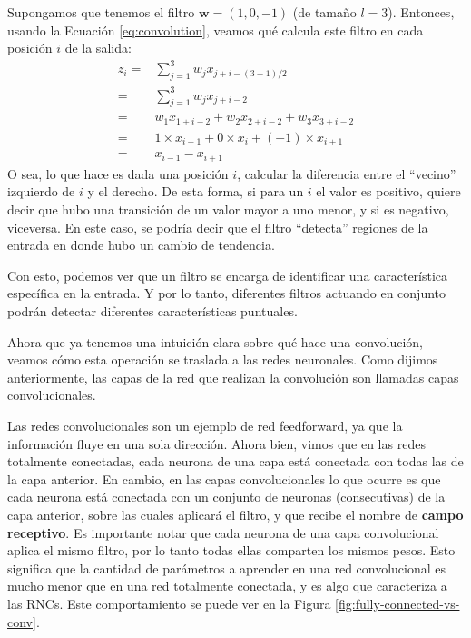 \documentclass[../../main.tex]{subfiles}
\begin{document}
Supongamos que tenemos el filtro \(\bm{w} = (1, 0, -1)\) (de tamaño \(l=3\)). Entonces,
usando la Ecuación \ref{eq:convolution}, veamos qué calcula este filtro en cada
posición \(i\) de la salida:
\begin{align*}
    z_i =& \sum_{j=1}^3 w_j x_{j+i-(3+1)/2} \\
        =& \sum_{j=1}^3 w_j x_{j+i-2} \\
        =& w_1 x_{1+i-2} + w_2 x_{2+i-2} + w_3 x_{3+i-2} \\
        =& 1 \times x_{i-1} + 0 \times x_i + (-1) \times x_{i+1} \\
        =& x_{i-1} - x_{i+1}
\end{align*}
O sea, lo que hace es dada una posición \(i\), calcular la diferencia entre el ``vecino''
izquierdo de \(i\) y el derecho. De esta forma, si para un \(i\) el valor es positivo,
quiere decir que hubo una transición de un valor mayor a uno menor, y si es negativo,
viceversa. En este caso, se podría decir que el filtro ``detecta'' regiones de la entrada
en donde hubo un cambio de tendencia.

Con esto, podemos ver que un filtro se encarga de identificar una característica
específica en la entrada. Y por lo tanto, diferentes filtros actuando en conjunto podrán
detectar diferentes características puntuales.

Ahora que ya tenemos una intuición clara sobre qué hace una convolución, veamos
cómo esta operación se traslada a las redes neuronales. Como dijimos anteriormente,
las capas de la red que realizan la convolución son llamadas capas convolucionales.

Las redes convolucionales son un ejemplo de red feedforward, ya que la información fluye
en una sola dirección. Ahora bien, vimos que en las redes totalmente conectadas, cada
neurona de una capa está conectada con todas las de la capa anterior. En cambio, en las
capas convolucionales lo que ocurre es que cada neurona está conectada con un conjunto de
neuronas (consecutivas) de la capa anterior, sobre las cuales aplicará el filtro, y que
recibe el nombre de \textbf{campo receptivo}. Es importante notar que cada neurona de una
capa convolucional aplica el mismo filtro, por lo tanto todas ellas comparten los mismos
pesos. Esto significa que la cantidad de parámetros a aprender en una red convolucional es
mucho menor que en una red totalmente conectada, y es algo que caracteriza a las RNCs.
Este comportamiento se puede ver en la Figura \ref{fig:fully-connected-vs-conv}.
\end{document}
